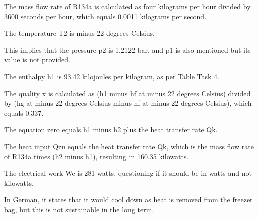 The mass flow rate of R134a is calculated as four kilograms per hour divided by 3600 seconds per hour, which equals 0.0011 kilograms per second.

The temperature T2 is minus 22 degrees Celsius.

This implies that the pressure p2 is 1.2122 bar, and p1 is also mentioned but its value is not provided.

The enthalpy h1 is 93.42 kilojoules per kilogram, as per Table Task 4.

The quality x is calculated as (h1 minus hf at minus 22 degrees Celsius) divided by (hg at minus 22 degrees Celsius minus hf at minus 22 degrees Celsius), which equals 0.337.

The equation zero equals h1 minus h2 plus the heat transfer rate Qk.

The heat input Qzu equals the heat transfer rate Qk, which is the mass flow rate of R134a times (h2 minus h1), resulting in 160.35 kilowatts.

The electrical work We is 281 watts, questioning if it should be in watts and not kilowatts.

In German, it states that it would cool down as heat is removed from the freezer bag, but this is not sustainable in the long term.